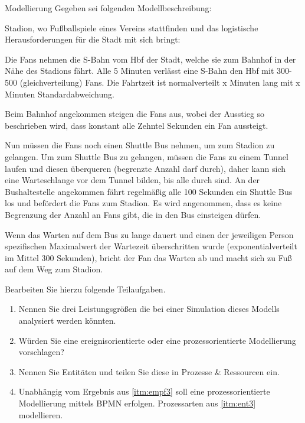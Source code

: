 \documentclass{article}
\begin{document}
\begin{exercise}{Modellierung}
  Gegeben sei folgenden Modellbeschreibung:
  \par Stadion, wo Fußballspiele eines Vereins stattfinden und das logistische Herausforderungen für die Stadt mit sich bringt:
  \par Die Fans nehmen die S-Bahn vom Hbf der Stadt, welche sie zum Bahnhof in der Nähe des Stadions fährt. Alle 5 Minuten verlässt eine S-Bahn den Hbf mit 300-500 (gleichverteilung) Fans. Die Fahrtzeit ist normalverteilt x Minuten lang mit x Minuten Standardabweichung.
  \par Beim Bahnhof angekommen steigen die Fans aus, wobei der Ausstieg so beschrieben wird, dass konstant alle Zehntel Sekunden ein Fan aussteigt.
  \par Nun müssen die Fans noch einen Shuttle Bus nehmen, um zum Stadion zu gelangen. Um zum Shuttle Bus zu gelangen, müssen die Fans zu einem Tunnel laufen und diesen überqueren (begrenzte Anzahl darf durch), daher kann sich eine Warteschlange vor dem Tunnel bilden, bis alle durch sind. An der Bushaltestelle angekommen fährt regelmäßig alle 100 Sekunden ein Shuttle Bus los und befördert die Fans zum Stadion. Es wird angenommen, dass es keine Begrenzung der Anzahl an Fans gibt, die in den Bus einsteigen dürfen.
  \par Wenn das Warten auf dem Bus zu lange dauert und einen der jeweiligen Person spezifischen Maximalwert der Wartezeit überschritten wurde (exponentialverteilt im Mittel 300 Sekunden), bricht der Fan das Warten ab und macht sich zu Fuß auf dem Weg zum Stadion.

  Bearbeiten Sie hierzu folgende Teilaufgaben.
  \begin{enumerate}
    \item Nennen Sie drei Leistungsgrößen die bei einer Simulation dieses Modells analysiert werden könnten.
    \item\label{itm:empf3} Würden Sie eine ereignisorientierte oder eine prozessorientierte Modellierung vorschlagen?
    \item\label{itm:ent3} Nennen Sie Entitäten und teilen Sie diese in Prozesse \& Ressourcen ein.
    \item Unabhängig vom Ergebnis aus \ref{itm:empf3} soll eine prozessorientierte Modellierung mittels BPMN erfolgen. Prozessarten aus \ref{itm:ent3} modellieren.
  \end{enumerate}


\end{exercise}
\end{document}

